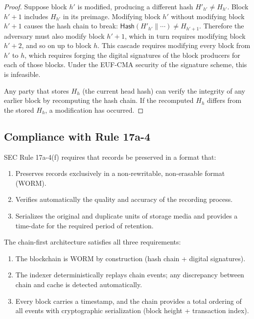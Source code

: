 \documentclass[11pt,a4paper]{article}
\begin{document}
\begin{proof}
Suppose block $h'$ is modified, producing a different hash
$H'_{h'} \neq H_{h'}$.  Block $h'+1$ includes $H_{h'}$ in its
preimage.  Modifying block $h'$ without modifying block $h'+1$ causes
the hash chain to break: $\mathsf{Hash}(H'_{h'} \| \cdots) \neq
H_{h'+1}$.  Therefore the adversary must also modify block $h'+1$,
which in turn requires modifying block $h'+2$, and so on up to block
$h$.  This cascade requires modifying every block from $h'$ to $h$,
which requires forging the digital signatures of the block producers
for each of those blocks.  Under the EUF-CMA security of the signature
scheme, this is infeasible.

Any party that stores $H_h$ (the current head hash) can verify the
integrity of any earlier block by recomputing the hash chain.  If
the recomputed $H_h$ differs from the stored $H_h$, a modification
has occurred.
\end{proof}

\subsection{Compliance with Rule 17a-4}

SEC Rule 17a-4(f) requires that records be preserved in a format that:
\begin{enumerate}[nosep]
  \item Preserves records exclusively in a non-rewritable,
        non-erasable format (WORM).
  \item Verifies automatically the quality and accuracy of the
        recording process.
  \item Serializes the original and duplicate units of storage media
        and provides a time-date for the required period of retention.
\end{enumerate}

The chain-first architecture satisfies all three requirements:
\begin{enumerate}[nosep]
  \item The blockchain is WORM by construction (hash chain + digital
        signatures).
  \item The indexer deterministically replays chain events; any
        discrepancy between chain and cache is detected automatically.
  \item Every block carries a timestamp, and the chain provides a
        total ordering of all events with cryptographic serialization
        (block height + transaction index).
\end{enumerate}
\end{document}
